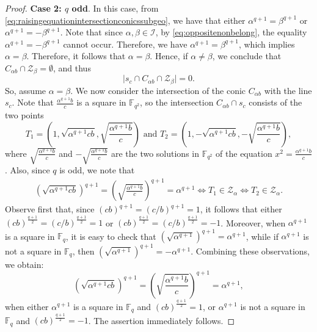 \documentclass[11pt]{article}
\theoremstyle{definition}
\numberwithin{equation}{section}
\def\cZ{\mathcal Z}
\begin{document}
\begin{proof}
\textbf{Case 2: $q$ odd}. In this case, from \eqref{eq:raisingequationintersectionconicssubgeo}, we have that either $\alpha^{q+1} = \beta^{q+1}$ or $\alpha^{q+1} = -\beta^{q+1}$. Note that since $\alpha, \beta \in \mathcal{I}$, by \eqref{eq:oppositenonbelong}, the equality $\alpha^{q+1} = -\beta^{q+1}$ cannot occur. Therefore, we have $\alpha^{q+1} = \beta^{q+1}$, which implies $\alpha = \beta$.
 Therefore, it follows that $\alpha = \beta$. Hence, if $\alpha \ne \beta$, we conclude that $C_{\alpha b} \cap \mathcal{Z}_\beta = \emptyset$, and thus
\[
\lvert s_c \cap C_{\alpha b} \cap \mathcal{Z}_\beta \rvert = 0.
\]
So, assume $\alpha=\beta$. We now consider the intersection of the conic $C_{\alpha b}$ with the line $s_c$. Note that $\frac{\alpha^{q+1}b}{c}$ is a square in $\mathbb{F}_{q^2}$, so the intersection $C_{\alpha b} \cap s_c$ consists of the two points
\[
T_1=\left(1,\sqrt{\alpha^{q+1}cb}, \sqrt{\frac{\alpha^{q+1}b}c}\right) \mbox{ and }T_2=\left(1,-\sqrt{\alpha^{q+1}cb}, -\sqrt{\frac{\alpha^{q+1}b}c}\right),
\]
where $\sqrt{\frac{\alpha^{q+1}b}{c}}$ and $-\sqrt{\frac{\alpha^{q+1}b}{c}}$ are the two solutions in $\mathbb{F}_{q^2}$ of the equation $x^2 = \frac{\alpha^{q+1}b}{c}$.
Also, since $q$ is odd, we note that 
\begin{align*}
    \left(\sqrt{\alpha^{q+1}cb}\right)^{q+1}= \left(\sqrt{\frac{\alpha^{q+1}b}c}\right)^{q+1}=\alpha^{q+1} \iff T_1 \in \cZ_{\alpha} \iff T_2 \in \cZ_{\alpha}.
\end{align*}
Observe first that, since $(cb)^{q+1} = (c/b)^{q+1} = 1$, it follows that either $(cb)^{\frac{q+1}{2}}=(c/b)^{\frac{q+1}{2}}=1$ or $(cb)^{\frac{q+1}{2}}=(c/b)^{\frac{q+1}{2}}=-1$. Moreover, when $\alpha^{q+1}$ is a square in $\mathbb{F}_q$, it is easy to check that $\left(\sqrt{\alpha^{q+1}}\right)^{q+1}=\alpha^{q+1}$, while if $\alpha^{q+1}$ is not a square in $\mathbb{F}_q$, then $\left(\sqrt{\alpha^{q+1}}\right)^{q+1}=-\alpha^{q+1}$. Combining these observations, we obtain:
\[
\left(\sqrt{\alpha^{q+1}cb}\right)^{q+1}= \left(\sqrt{\frac{\alpha^{q+1}b}c}\right)^{q+1}=\alpha^{q+1},
\]
when either $\alpha^{q+1}$ is a square in $\mathbb{F}_q$ and $(cb)^{\frac{q+1}{2}} = 1$, or $\alpha^{q+1}$ is not a square in $\mathbb{F}_q$ and $(cb)^{\frac{q+1}{2}} = -1$. The assertion immediately follows.
\end{proof}
\end{document}
